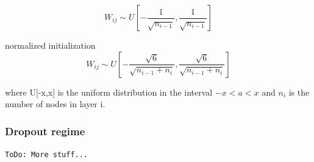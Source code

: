 \begin{equation} \label{eq:weight_init_regular}
W_{ij} \sim U[-\frac{1}{\sqrt{n_{i-1}}},\frac{1}{\sqrt{n_{i-1}}}]
\end{equation}

normalized initialization
\begin{equation} \label{eq:weight_init_normalized}
W_{ij} \sim U[-\frac{\sqrt{6}}{\sqrt{n_{i-1}+n_{i}}},\frac{\sqrt{6}}{\sqrt{n_{i-1}+n_{i}}}]
\end{equation}

where U[-x,x] is the uniform distribution in the interval $-x < a < x$ and $n_{i}$ is the number of nodes in layer i.

\subsubsection{Dropout regime}
\texttt{ToDo: More stuff...}

